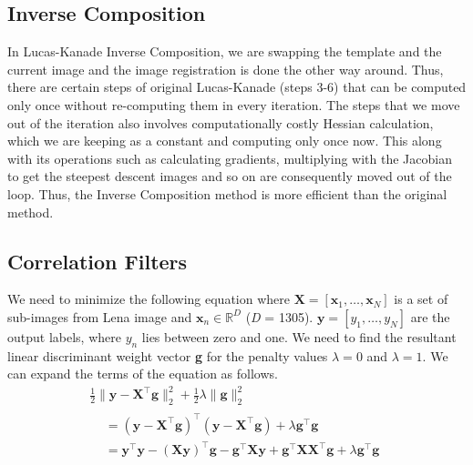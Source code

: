 \documentclass[a4paper]{article}
\begin{document}
\subsection{Inverse Composition}

In Lucas-Kanade Inverse Composition, we are swapping the template and the current image and the image registration is done the other way around. Thus, there are certain steps of original Lucas-Kanade (steps 3-6) that can be computed only once without re-computing them in every iteration. The steps that we move out of the iteration also involves computationally costly Hessian calculation, which we are keeping as a constant and computing only once now. This along with its operations such as calculating gradients, multiplying with the Jacobian to get the steepest descent images and so on are consequently moved out of the loop. Thus, the Inverse Composition method is more efficient than the original method.

\subsection{Correlation Filters}
We need to minimize the following equation where $\mathbf { X } = \left[ \mathbf { x } _ { 1 } , \ldots , \mathbf { x } _ { N } \right]$ is a set of sub-images from Lena image and $\mathbf { x } _ { n } \in \mathbb { R } ^ { D }$ (\textit{D} = 1305). $\mathbf { y } = \left[ y _ { 1 } , \ldots , y _ { N } \right]$ are the output labels, where $y _ { n }$ lies between zero and one. We need to find the resultant linear discriminant weight vector \textbf{g} for the penalty values $\lambda = 0$ and $\lambda = 1$. We can expand the terms of the equation as follows.
\begin{gather}
\frac{1}{2} \| \mathbf { y } - \boldsymbol { X } ^ { \top } \mathbf { g } \| _ { 2 } ^ { 2 } + \frac{1}{2} \lambda \| \mathbf { g } \| _ { 2 } ^ { 2 }
\\
\begin{array}{c}
&= ( \mathbf { y } - \boldsymbol { X } ^ { \top } \mathbf { g } ) ^ { \top } ( \mathbf { y } - \boldsymbol { X } ^ { \top } \mathbf { g } ) + \lambda \mathbf { g } ^ { \top } \mathbf { g } 
\\
&= \mathbf { y } ^ { \top } \mathbf { y } - \left( \boldsymbol { X } \mathbf { y } \right) ^ { \top } \mathbf { g } - \mathbf { g } ^ { \top } \boldsymbol { X } \mathbf { y } + \mathbf { g } ^ { \top } \boldsymbol { X } \boldsymbol { X } ^ { \top } \mathbf { g } + \lambda \mathbf { g } ^ { \top } \mathbf { g }
\end{array}
\end{gather}
\end{document}
